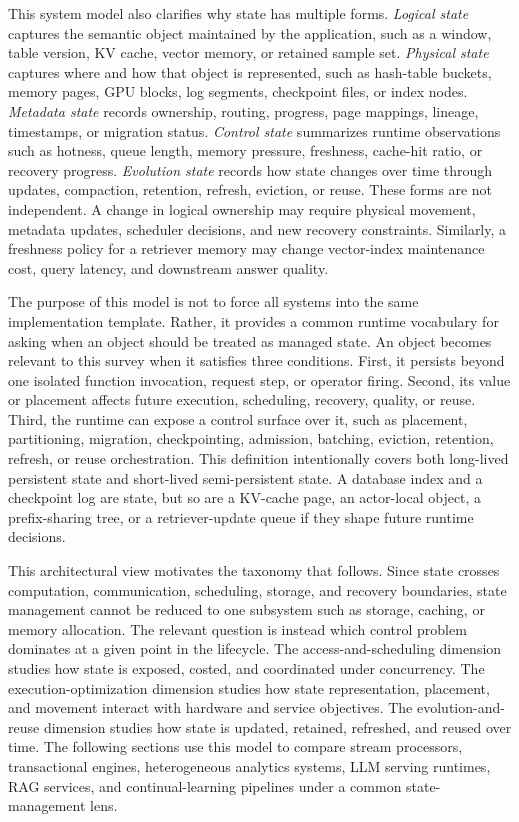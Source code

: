 \documentclass[acmsmall,screen,review]{acmart}
\begin{document}
This system model also clarifies why state has multiple forms. \emph{Logical state} captures the semantic object maintained by the application, such as a window, table version, KV cache, vector memory, or retained sample set. \emph{Physical state} captures where and how that object is represented, such as hash-table buckets, memory pages, GPU blocks, log segments, checkpoint files, or index nodes. \emph{Metadata state} records ownership, routing, progress, page mappings, lineage, timestamps, or migration status. \emph{Control state} summarizes runtime observations such as hotness, queue length, memory pressure, freshness, cache-hit ratio, or recovery progress. \emph{Evolution state} records how state changes over time through updates, compaction, retention, refresh, eviction, or reuse. These forms are not independent. A change in logical ownership may require physical movement, metadata updates, scheduler decisions, and new recovery constraints. Similarly, a freshness policy for a retriever memory may change vector-index maintenance cost, query latency, and downstream answer quality.

The purpose of this model is not to force all systems into the same implementation template. Rather, it provides a common runtime vocabulary for asking when an object should be treated as managed state. An object becomes relevant to this survey when it satisfies three conditions. First, it persists beyond one isolated function invocation, request step, or operator firing. Second, its value or placement affects future execution, scheduling, recovery, quality, or reuse. Third, the runtime can expose a control surface over it, such as placement, partitioning, migration, checkpointing, admission, batching, eviction, retention, refresh, or reuse orchestration. This definition intentionally covers both long-lived persistent state and short-lived semi-persistent state. A database index and a checkpoint log are state, but so are a KV-cache page, an actor-local object, a prefix-sharing tree, or a retriever-update queue if they shape future runtime decisions.

This architectural view motivates the taxonomy that follows. Since state crosses computation, communication, scheduling, storage, and recovery boundaries, state management cannot be reduced to one subsystem such as storage, caching, or memory allocation. The relevant question is instead which control problem dominates at a given point in the lifecycle. The access-and-scheduling dimension studies how state is exposed, costed, and coordinated under concurrency. The execution-optimization dimension studies how state representation, placement, and movement interact with hardware and service objectives. The evolution-and-reuse dimension studies how state is updated, retained, refreshed, and reused over time. The following sections use this model to compare stream processors, transactional engines, heterogeneous analytics systems, LLM serving runtimes, RAG services, and continual-learning pipelines under a common state-management lens.
\end{document}
